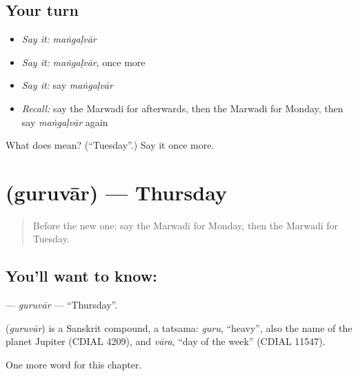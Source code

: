 \subsection*{Your turn}
\begin{itemize}
\raggedright
  \item \emph{Say it:} \emph{maṅgaḷvār}
  \item \emph{Say it:} \emph{maṅgaḷvār}, once more
  \item \emph{Say it:} say \emph{maṅgaḷvār}
  \item \emph{Recall:} say the Marwadi for afterwards, then the Marwadi for Monday, then say \emph{maṅgaḷvār} again
\end{itemize}

\begin{tcolorbox}[breakable,colback=teal!4,colframe=teal!35!black,title={Before you move on}]
What does  mean? (\textquotedblleft{}Tuesday\textquotedblright{}.) Say it once more.
\end{tcolorbox}
\section[\texorpdfstring{\mw{गुरुवार} (guruvār)}{गुरुवार (guruvār)}]{ (guruvār) — Thursday}

\label{lesson:MW-C91-guruvar}



\begin{quote}
Before the new one: say the Marwadi for Monday, then the Marwadi for Tuesday.
\end{quote}

\subsection*{You'll want to know: }
\textbf{} — \emph{guruvār} — \textquotedblleft{}Thursday\textquotedblright{}.

\begin{cousinweb}
\textbf{} (\emph{guruvār}) is a Sanskrit compound, a tatsama: \emph{guru}, \textquotedblleft{}heavy\textquotedblright{}, also the name of the planet Jupiter (CDIAL 4209), and \emph{vāra}, \textquotedblleft{}day of the week\textquotedblright{} (CDIAL 11547).
\end{cousinweb}

\begin{grammarlens}[title={What you've built}]
One more word for this chapter.
\end{grammarlens}

